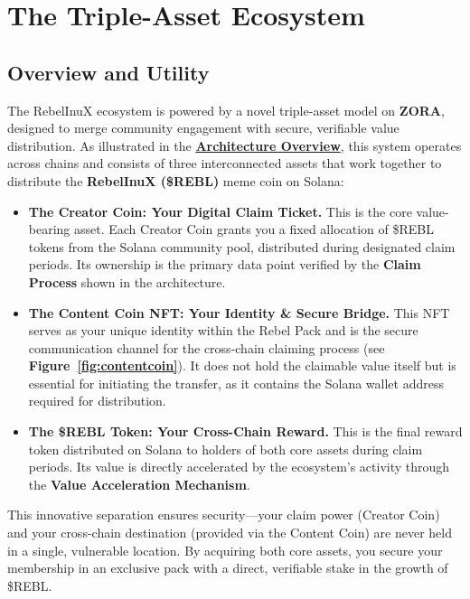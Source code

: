 \documentclass{article}
\begin{document}
\section[
  \texorpdfstring{\color{primaryColor}The Triple-Asset Ecosystem}{The Triple-Asset Ecosystem}
]{\color{primaryColor}\textbf{The Triple-Asset Ecosystem}}
\label{sec:Triple-Asset} 
\begin{tcolorbox}[colback=headerColor!10!white, colframe=headerColor, boxrule=2pt, width=\textwidth, arc=6mm, left=8mm, right=8mm, top=6mm, bottom=6mm]

\subsection[
  \texorpdfstring{\color{primaryColor}Overview and Utility}{Overview and Utility}
]{\color{primaryColor}Overview and Utility}
The RebelInuX ecosystem is powered by a novel triple-asset model on \textbf{ZORA}, designed to merge community engagement with secure, verifiable value distribution. As illustrated in the \hyperref[sec:Architecture]{\textbf{Architecture Overview}}, this system operates across chains and consists of three interconnected assets that work together to distribute the \textbf{RebelInuX (\$REBL)} meme coin on Solana: %

\begin{itemize}
    \item \textbf{The Creator Coin: Your Digital Claim Ticket.} This is the core value-bearing asset. Each Creator Coin grants you a fixed allocation of \$REBL tokens from the Solana community pool, distributed during designated claim periods. Its ownership is the primary data point verified by the \textbf{Claim Process} shown in the architecture.
    \item \textbf{The Content Coin NFT: Your Identity \& Secure Bridge.} This NFT serves as your unique identity within the Rebel Pack and is the secure communication channel for the cross-chain claiming process (see \textbf{Figure~\ref{fig:contentcoin}}). It does not hold the claimable value itself but is essential for initiating the transfer, as it contains the Solana wallet address required for distribution.
    \item \textbf{The \$REBL Token: Your Cross-Chain Reward.} This is the final reward token distributed on Solana to holders of both core assets during claim periods. Its value is directly accelerated by the ecosystem's activity through the \textbf{Value Acceleration Mechanism}.
\end{itemize}

This innovative separation ensures security—your claim power (Creator Coin) and your cross-chain destination (provided via the Content Coin) are never held in a single, vulnerable location. By acquiring both core assets, you secure your membership in an exclusive pack with a direct, verifiable stake in the growth of \$REBL.
\end{tcolorbox}
\end{document}
